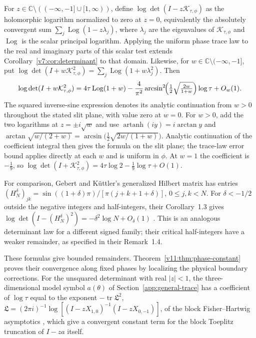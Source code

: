 \begin{remark}\label{rem:det-square}
For $z\in\mathbb C\setminus(( -\infty,-1]\cup[1,\infty))$, define
$\log\det(I-z\mathcal K_{\tau,\phi})$ as the holomorphic logarithm
normalized to zero at $z=0$, equivalently the absolutely convergent sum
$\sum_j\operatorname{Log}(1-z\lambda_j)$, where $\lambda_j$ are the eigenvalues of $\mathcal K_{\tau,\phi}$ and
$\operatorname{Log}$ is the scalar principal logarithm.  Applying the uniform phase trace law
to the real and imaginary parts of this scalar test extends
Corollary~\ref{v7:cor:determinant} to that domain.
Likewise, for $w\in\mathbb C\setminus(-\infty,-1]$, put
$\log\det(I+w\mathcal K_{\tau,\phi}^2)
=\sum_j\operatorname{Log}(1+w\lambda_j^2)$.  Then
\begin{equation}\label{eq:det-square}
 \log\det(I+w\mathcal K_{\tau,\phi}^2)
 =4\tau\operatorname{Log}(1+w)
  -\frac4{\pi^2}\arcsin^2\!\Bigl(\tfrac12\sqrt{\tfrac{2w}{1+w}}\Bigr)\log\tau
  +O_w(1).
\end{equation}
The squared inverse-sine expression denotes its analytic continuation
from $w>0$ throughout the stated slit plane, with value zero at $w=0$.
For $w>0$, add the two logarithms at $z=\pm i\sqrt w$ and use
$\operatorname{artanh}(iy)=i\arctan y$ and
$\arctan\sqrt{w/(2+w)}=\arcsin\bigl(\tfrac12\sqrt{2w/(1+w)}\bigr)$.
Analytic continuation of the coefficient integral then gives the formula
on the slit plane; the trace-law error bound applies directly at each $w$
and is uniform in $\phi$.  At $w=1$ the coefficient is $-\tfrac19$, so
$\log\det(I+\mathcal K_{\tau,\phi}^2)=4\tau\log2-\tfrac19\log\tau+O(1)$.

For comparison, Gebert and K\"uttler's generalized Hilbert matrix has
entries $(H_N^\delta)_{jk}=\sin((1+\delta)\pi)/[\pi(j+k+1+\delta)]$,
$0\le j,k<N$.  For $\delta<-1/2$ outside the negative integers and
half-integers, their Corollary~1.3 gives
$\log\det(I-(H_N^\delta)^2)=-\delta^2\log N+O_\delta(1)$
\cite{GebertKuettler2026}.  This is an analogous determinant law for a
different signed family; their critical half-integers have a weaker
remainder, as specified in their Remark~1.4.
\end{remark}

These formulas give bounded remainders. Theorem~\ref{v11:thm:phase-constant} proves their convergence along fixed phases by localizing the physical boundary corrections.  For the unsquared determinant with real $|z|<1$, the three-dimensional model
symbol $a(\theta)$ of Section~\ref{app:general-trace} has a coefficient of
$\log\tau$ equal to the exponent $-\operatorname{tr}\mathfrak L^2$,
$\mathfrak L=(2\pi i)^{-1}\log[(I-zX_{1,0})^{-1}(I-zX_{0,-1})]$, of the block
Fisher--Hartwig asymptotics \cite[Corollary~2.4]{BasorEhrhardtVirtanen2024},
which give a convergent constant term for the block Toeplitz truncation of
$I-za$ itself.


